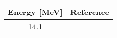\centering
\begin{tabular}{c c}
    \toprule
    \bf{Energy [MeV]} & \bf{Reference} \\
    \midrule
    14.1 & \cite{Meier1969}\\
    \bottomrule
\end{tabular}
